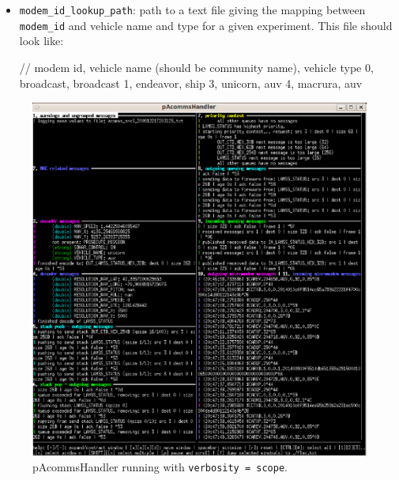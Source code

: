 \documentclass[11pt, letterpaper, oneside]{memoir}
\begin{document}
\begin{itemize}
\item \verb|modem_id_lookup_path|: path to a text file giving the mapping between \verb|modem_id| and vehicle name and type for a given experiment. This file should look like:
\begin{boxedverbatim}
// modem id, vehicle name (should be community name), vehicle type
0, broadcast, broadcast
1, endeavor, ship
3, unicorn, auv
4, macrura, auv
\end{boxedverbatim}
\resetbvlinenumber
\end{itemize}


\begin{figure}[tp]
  \centering 
  \includegraphics[scale=1]{pAcommsHandler_scope.eps}
\caption{pAcommsHandler running with \texttt{verbosity = scope}. \label{fig:scope}}
\end{figure}
\end{document}

